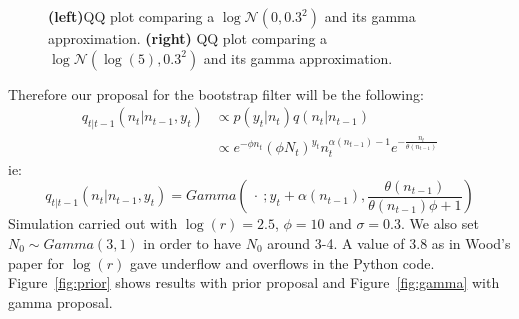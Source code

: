 \documentclass{article}
\begin{document}
\begin{figure}[htb]
\begin{minipage}{.45\textwidth}
	\end{minipage}
	\caption{\textbf{(left)}QQ plot comparing a $\log\mathcal{N}(0, 0.3^2)$ and its gamma approximation. \textbf{(right)} QQ plot comparing a $\log\mathcal{N}(\log(5), 0.3^2)$ and its gamma approximation.}
	\label{fig:approx}
\end{figure}

Therefore our proposal for the bootstrap filter will be the following:
\begin{equation*}
\begin{split}
q_{t|t-1}(n_t|n_{t-1}, y_t) & \propto  p(y_t|n_t)q(n_t|n_{t-1}) \\
& \propto e^{-\phi n_t}(\phi N_t)^{y_t}n_t^{\alpha(n_{t-1})-1}e^{-\frac{n_t}{\theta(n_{t-1})}}
\end{split}
\end{equation*}
ie:
\begin{equation*}
q_{t|t-1}(n_t|n_{t-1}, y_t) = Gamma(\ \cdot \ ; y_t+\alpha(n_{t-1}), \frac{\theta(n_{t-1})}{\theta(n_{t-1})\phi + 1})\end{equation*}
Simulation carried out with $\log(r)=2.5$, $\phi=10$ and $\sigma=0.3$. We also set $N_0 \sim Gamma(3,1)$ in order to have $N_0$ around 3-4. A value of 3.8 as in Wood's paper for $\log(r)$ gave underflow and overflows in the Python code. Figure~\ref{fig:prior} shows results with prior proposal and Figure~\ref{fig:gamma} with gamma proposal.
\end{document}
